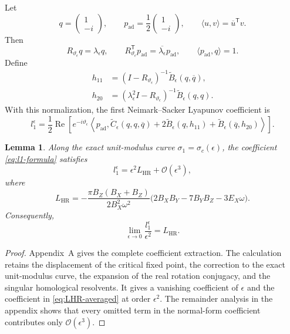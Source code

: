 \documentclass[11pt]{amsart}
\newtheorem{lemma}[theorem]{Lemma}
\theoremstyle{remark}
\newcommand{\cO}{\mathcal{O}}
\newcommand{\LHR}{L_{\mathrm{HR}}}
\begin{document}
Let
\[
 q=\begin{pmatrix}1\\-i\end{pmatrix},
 \qquad
 p_{\mathrm{ad}}=\frac12\begin{pmatrix}1\\-i\end{pmatrix},
 \qquad
 \langle u,v\rangle=\overline{u}^{\mathsf T}v.
\]
Then
\[
 R_{\vartheta_\epsilon}q=\lambda_\epsilon q,
 \qquad
 R_{\vartheta_\epsilon}^{\mathsf T}p_{\mathrm{ad}}
=\overline{\lambda_\epsilon}p_{\mathrm{ad}},
 \qquad
 \langle p_{\mathrm{ad}},q\rangle=1.
\]
Define
\[
\begin{aligned}
h_{11}
&=(I-R_{\vartheta_\epsilon})^{-1}
\widetilde B_\epsilon(q,\overline q),\\
h_{20}
&=(\lambda_\epsilon^2I-R_{\vartheta_\epsilon})^{-1}
\widetilde B_\epsilon(q,q).
\end{aligned}
\]
With this normalization, the first Neimark--Sacker Lyapunov coefficient is
\begin{equation}\label{eq:l1-formula}
l_1^\epsilon
=\frac12\operatorname{Re}\left[
e^{-i\vartheta_\epsilon}
\left\langle p_{\mathrm{ad}},
\widetilde C_\epsilon(q,q,\overline q)
+2\widetilde B_\epsilon(q,h_{11})
+\widetilde B_\epsilon(\overline q,h_{20})
\right\rangle\right].
\end{equation}

\begin{lemma}\label{lem:l1}
Along the exact unit-modulus curve
\(\sigma_1=\sigma_c(\epsilon)\), the coefficient
\eqref{eq:l1-formula} satisfies
\begin{equation}\label{eq:l1-asymptotic}
 l_1^\epsilon=\epsilon^2\LHR+\cO(\epsilon^3),
\end{equation}
where
\begin{equation}\label{eq:LHR-averaged}
 \LHR
=-\frac{\pi B_Z(B_X+B_Z)}{2B_X^2\omega^2}
\bigl(2B_XB_Y-7B_YB_Z-3E_X\omega\bigr).
\end{equation}
Consequently,
\[
 \lim_{\epsilon\to0}\frac{l_1^\epsilon}{\epsilon^2}=\LHR.
\]
\end{lemma}

\begin{proof}
Appendix~A gives the complete coefficient extraction.  The calculation
retains the displacement of the critical fixed point, the correction to the
exact unit-modulus curve, the expansion of the real rotation conjugacy, and
the singular homological resolvents.  It
gives a vanishing coefficient of \(\epsilon\) and the coefficient in
\eqref{eq:LHR-averaged} at order \(\epsilon^2\).  The remainder analysis in
the appendix shows that every omitted term in the normal-form coefficient
contributes only \(\cO(\epsilon^3)\).
\end{proof}
\end{document}
